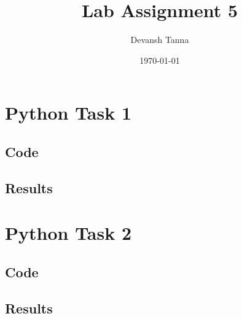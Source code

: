 \documentclass[
	12pt, 
]{fphw_assignment_toc}
\title{Lab Assignment 5}        %
\author{Devansh Tanna}    %
\date{\today}     %
\institute{Department of Electrical and Electronics}              %
\begin{document}
\maketitle
\newpage
{}    %
\tableofcontents
\newpage
{}          %


\section{Python Task 1}

\subsection{Code}

\noindent


\subsection{Results}
\noindent




\newpage
\section{Python Task 2}

\subsection{Code}

\noindent


\subsection{Results}
\noindent
\printbibliography[heading=bibintoc, title={References}]
\end{document}
